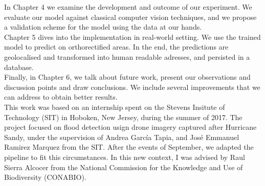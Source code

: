 In Chapter 4 we examine the development and outcome of our experiment. We evaluate our model against classical computer vision techniques, and we propose a validation scheme for the model using the data at our hands.\\

Chapter 5 dives into the implementation in real-world setting. We use the trained model to predict on orthorectified areas. In the end, the predictions are geolocalised and transformed into human readable adresses, and persisted in a database.\\

Finally, in Chapter 6, we talk about future work, present our observations and discussion points and draw conclusions. We include several improvements that we can address to obtain better results.\\

This work was based on an internship spent on the Stevens Insitute of Technology (SIT) in Hoboken, New Jersey, during the summer of 2017. The project focused on flood detection usign drone imagery captured after Hurricane Sandy, under the supervision of Andrea Garc\'ia Tapia, and Jos\'e Emmanuel Ramirez Marquez from the SIT. After the events of September, we adapted the pipeline to fit this circumstances. In this new context, I was advised by Raul Sierra Alcocer from the National Commission for the Knowledge and Use of Biodiversity (CONABIO).\\